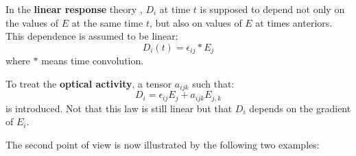 \documentclass[12pt]{book}
\begin{document}
\begin{exmp}
In the {\bf linear response } theory , $D_i$ at time $t$ is supposed to depend not only on the values of
$E$ at the same time $t$, but also on values of $E$ at times anteriors. This
dependence is assumed to be linear:
\begin{equation}
D_i(t)=\epsilon_{ij}*E_j
\end{equation}
where $*$ means time convolution.
\end{exmp}

\begin{exmp}
To treat the {\bf optical activity}\cite{ph:elect:LandauEle}, a
tensor
$a_{ijk}$ such that:
\begin{equation}
D_i=\epsilon_{ij}E_j+a_{ijk}E_{j,k}
\end{equation}
is introduced. Not that this law is still linear but that $D_i$ depends on the
gradient of $E_i$.
\end{exmp}
The second point of view is now illustrated by the following two examples:
\end{document}
